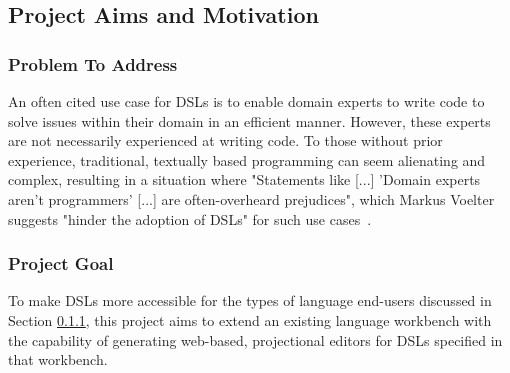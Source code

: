 \documentclass{article}
\begin{document}
\subsection{Project Aims and Motivation}

\subsubsection{Problem To Address}\label{problem}

An often cited use case for DSLs is to enable domain experts to write code to solve issues within their domain in an efficient manner. However, these experts are not necessarily experienced at writing code. To those without prior experience, traditional, textually based programming can seem alienating and complex, resulting in a situation where "Statements like [...] 'Domain experts aren't programmers' [...] are often-overheard prejudices", which Markus Voelter suggests "hinder the adoption of DSLs" for such use cases~\cite[pg.45]{dslEngineering}.

\subsubsection{Project Goal}\label{goal}
To make DSLs more accessible for the types of language end-users discussed in Section \ref{problem}, this project aims to extend an existing language workbench with the capability of generating web-based, projectional editors for DSLs specified in that workbench. 
\end{document}
